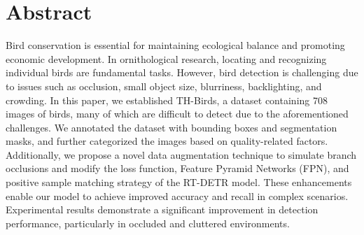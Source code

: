 \section{Abstract}
Bird conservation is essential for maintaining ecological balance and promoting economic development. 
In ornithological research, locating and recognizing individual birds are fundamental tasks. 
However, bird detection is challenging due to issues such as occlusion, small object size, blurriness, backlighting, and crowding. 
In this paper, we established TH-Birds, a dataset containing 708 images of birds, many of which are difficult to detect due to the aforementioned challenges. 
We annotated the dataset with bounding boxes and segmentation masks, and further categorized the images based on quality-related factors. 
Additionally, we propose a novel data augmentation technique to simulate branch occlusions and modify the loss function, Feature Pyramid Networks (FPN), and positive sample matching strategy of the RT-DETR model. 
These enhancements enable our model to achieve improved accuracy and recall in complex scenarios. 
Experimental results demonstrate a significant improvement in detection performance, particularly in occluded and cluttered environments.


